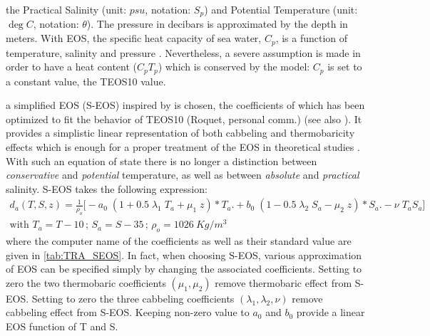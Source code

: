 \documentclass[../main/NEMO_manual]{subfiles}
\begin{document}
\begin{description}
  the Practical Salinity (unit: $psu$, notation: $S_p$) and
  Potential Temperature (unit: $\deg{C}$, notation: $\theta$).
  The pressure in decibars is approximated by the depth in meters.
  With EOS, the specific heat capacity of sea water, $C_p$, is a function of
  temperature, salinity and pressure \citep{fofonoff.millard_bk83}.
  Nevertheless, a severe assumption is made in order to have a heat content ($C_p T_p$) which
  is conserved by the model: $C_p$ is set to a constant value, the TEOS10 value.
\item [{\np[=.true.]{ln_seos}{ln\_seos}}] a simplified EOS (S-EOS) inspired by
  \citet{vallis_bk06} is chosen,
  the coefficients of which has been optimized to fit the behavior of TEOS10 (Roquet, personal comm.)
  (see also \citet{roquet.madec.ea_JPO15}).
  It provides a simplistic linear representation of both cabbeling and thermobaricity effects which
  is enough for a proper treatment of the EOS in theoretical studies \citep{roquet.madec.ea_JPO15}.
  With such an equation of state there is no longer a distinction between \textit{conservative} and
  \textit{potential} temperature, as well as between \textit{absolute} and
  \textit{practical} salinity.
  S-EOS takes the following expression:
  \begin{gather*}
    d_a(T,S,z) = \frac{1}{\rho_o} \big[ - a_0 \; ( 1 + 0.5 \; \lambda_1 \; T_a + \mu_1 \; z ) * T_a \big.
                                        + b_0 \; ( 1 - 0.5 \; \lambda_2 \; S_a - \mu_2 \; z ) * S_a
                                  \big. - \nu \;                           T_a                  S_a \big] \\
    \text{with~} T_a = T - 10 \, ; \, S_a = S - 35 \, ; \, \rho_o = 1026~Kg/m^3
  \end{gather*}
  where the computer name of the coefficients as well as their standard value are given in
  \autoref{tab:TRA_SEOS}.
  In fact, when choosing S-EOS, various approximation of EOS can be specified simply by
  changing the associated coefficients.
  Setting to zero the two thermobaric coefficients $(\mu_1,\mu_2)$
  remove thermobaric effect from S-EOS.
  Setting to zero the three cabbeling coefficients $(\lambda_1,\lambda_2,\nu)$
  remove   cabbeling effect from S-EOS.
  Keeping non-zero value to $a_0$ and $b_0$ provide a linear EOS function of T and S.
\end{description}
\end{document}
